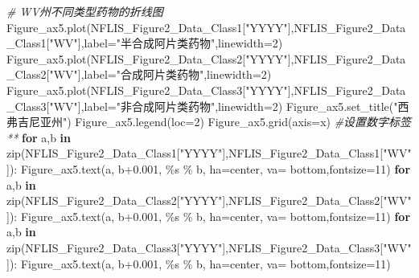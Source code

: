 \documentclass[
]{article}
\newenvironment{Shaded}{}{}
\newcommand{\BuiltInTok}[1]{#1}
\newcommand{\CommentTok}[1]{\textcolor[rgb]{0.38,0.63,0.69}{\textit{#1}}}
\newcommand{\ControlFlowTok}[1]{\textcolor[rgb]{0.00,0.44,0.13}{\textbf{#1}}}
\newcommand{\DecValTok}[1]{\textcolor[rgb]{0.25,0.63,0.44}{#1}}
\newcommand{\FloatTok}[1]{\textcolor[rgb]{0.25,0.63,0.44}{#1}}
\newcommand{\KeywordTok}[1]{\textcolor[rgb]{0.00,0.44,0.13}{\textbf{#1}}}
\newcommand{\NormalTok}[1]{#1}
\newcommand{\OperatorTok}[1]{\textcolor[rgb]{0.40,0.40,0.40}{#1}}
\newcommand{\SpecialCharTok}[1]{\textcolor[rgb]{0.25,0.44,0.63}{#1}}
\newcommand{\StringTok}[1]{\textcolor[rgb]{0.25,0.44,0.63}{#1}}
\begin{document}
\begin{Shaded}
\begin{Highlighting}[]
\CommentTok{\# WV州不同类型药物的折线图}
\NormalTok{Figure\_ax5.plot(NFLIS\_Figure2\_Data\_Class1[}\StringTok{"YYYY"}\NormalTok{],NFLIS\_Figure2\_Data\_Class1[}\StringTok{"WV"}\NormalTok{],label}\OperatorTok{=}\StringTok{"半合成阿片类药物"}\NormalTok{,linewidth}\OperatorTok{=}\DecValTok{2}\NormalTok{)}
\NormalTok{Figure\_ax5.plot(NFLIS\_Figure2\_Data\_Class2[}\StringTok{"YYYY"}\NormalTok{],NFLIS\_Figure2\_Data\_Class2[}\StringTok{"WV"}\NormalTok{],label}\OperatorTok{=}\StringTok{"合成阿片类药物"}\NormalTok{,linewidth}\OperatorTok{=}\DecValTok{2}\NormalTok{)}
\NormalTok{Figure\_ax5.plot(NFLIS\_Figure2\_Data\_Class3[}\StringTok{"YYYY"}\NormalTok{],NFLIS\_Figure2\_Data\_Class3[}\StringTok{"WV"}\NormalTok{],label}\OperatorTok{=}\StringTok{"非合成阿片类药物"}\NormalTok{,linewidth}\OperatorTok{=}\DecValTok{2}\NormalTok{)}
\NormalTok{Figure\_ax5.set\_title(}\StringTok{"西弗吉尼亚州"}\NormalTok{)}
\NormalTok{Figure\_ax5.legend(loc}\OperatorTok{=}\DecValTok{2}\NormalTok{)}
\NormalTok{Figure\_ax5.grid(axis}\OperatorTok{=}\StringTok{\textquotesingle{}x\textquotesingle{}}\NormalTok{)}
 \CommentTok{\#设置数字标签**}
\ControlFlowTok{for}\NormalTok{ a,b }\KeywordTok{in} \BuiltInTok{zip}\NormalTok{(NFLIS\_Figure2\_Data\_Class1[}\StringTok{"YYYY"}\NormalTok{],NFLIS\_Figure2\_Data\_Class1[}\StringTok{"WV"}\NormalTok{]):}
\NormalTok{    Figure\_ax5.text(a, b}\OperatorTok{+}\FloatTok{0.001}\NormalTok{, }\StringTok{\textquotesingle{}}\SpecialCharTok{\%s}\StringTok{\textquotesingle{}} \OperatorTok{\%}\NormalTok{ b, ha}\OperatorTok{=}\StringTok{\textquotesingle{}center\textquotesingle{}}\NormalTok{, va}\OperatorTok{=} \StringTok{\textquotesingle{}bottom\textquotesingle{}}\NormalTok{,fontsize}\OperatorTok{=}\DecValTok{11}\NormalTok{)}
\ControlFlowTok{for}\NormalTok{ a,b }\KeywordTok{in} \BuiltInTok{zip}\NormalTok{(NFLIS\_Figure2\_Data\_Class2[}\StringTok{"YYYY"}\NormalTok{],NFLIS\_Figure2\_Data\_Class2[}\StringTok{"WV"}\NormalTok{]):}
\NormalTok{    Figure\_ax5.text(a, b}\OperatorTok{+}\FloatTok{0.001}\NormalTok{, }\StringTok{\textquotesingle{}}\SpecialCharTok{\%s}\StringTok{\textquotesingle{}} \OperatorTok{\%}\NormalTok{ b, ha}\OperatorTok{=}\StringTok{\textquotesingle{}center\textquotesingle{}}\NormalTok{, va}\OperatorTok{=} \StringTok{\textquotesingle{}bottom\textquotesingle{}}\NormalTok{,fontsize}\OperatorTok{=}\DecValTok{11}\NormalTok{)}
\ControlFlowTok{for}\NormalTok{ a,b }\KeywordTok{in} \BuiltInTok{zip}\NormalTok{(NFLIS\_Figure2\_Data\_Class3[}\StringTok{"YYYY"}\NormalTok{],NFLIS\_Figure2\_Data\_Class3[}\StringTok{"WV"}\NormalTok{]):}
\NormalTok{    Figure\_ax5.text(a, b}\OperatorTok{+}\FloatTok{0.001}\NormalTok{, }\StringTok{\textquotesingle{}}\SpecialCharTok{\%s}\StringTok{\textquotesingle{}} \OperatorTok{\%}\NormalTok{ b, ha}\OperatorTok{=}\StringTok{\textquotesingle{}center\textquotesingle{}}\NormalTok{, va}\OperatorTok{=} \StringTok{\textquotesingle{}bottom\textquotesingle{}}\NormalTok{,fontsize}\OperatorTok{=}\DecValTok{11}\NormalTok{)}
    

\end{Highlighting}
\end{Shaded}
\end{document}
